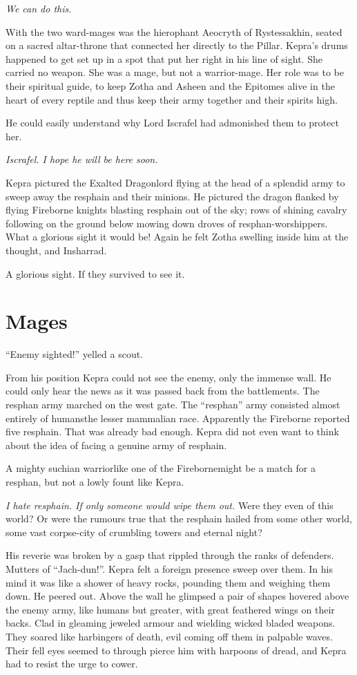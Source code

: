 \documentclass
  [a4paper,
   12pt,
   oneside
  ]%
  {article}
\begin{document}
\emph{We can do this.}

With the two ward-mages was the hierophant Aeocryth of Rystessakhin, seated on a sacred altar-throne that connected her directly to the Pillar. 
Kepra's drums happened to get set up in a spot that put her right in his line of sight. 
She carried no weapon. 
She was a mage, but not a warrior-mage. 
Her role was to be their spiritual guide, to keep Zotha and Asheen and the Epitomes alive in the heart of every reptile and thus keep their army together and their spirits high. 

He could easily understand why Lord Iscrafel had admonished them to protect her.

\emph{Iscrafel. I hope he will be here soon.} 

Kepra pictured the Exalted Dragonlord flying at the head of a splendid army to sweep away the resphain and their minions. He pictured the dragon flanked by flying Fireborne knights blasting resphain out of the sky; rows of shining cavalry following on the ground below mowing down droves of resphan-worshippers. 
What a glorious sight it would be! Again he felt Zotha swelling inside him at the thought, and Insharrad. 

A glorious sight. If they survived to see it.



\section{Mages}
``Enemy sighted!'' yelled a scout.

From his position Kepra could not see the enemy, only the immense wall. He could only hear the news as it was passed back from the battlements. 
The resphan army marched on the west gate. 
The ``resphan'' army consisted almost entirely of humans\dash{}the lesser mammalian race. 
Apparently the Fireborne reported five resphain. That was already bad enough. Kepra did not even want to think about the idea of facing a genuine army of resphain. 

A mighty suchian warrior\dash{}like one of the Fireborne\dash{}might be a match for a resphan, but not a lowly fount like Kepra. 

\emph{I hate resphain. If only someone would wipe them out.} Were they even of this world? Or were the rumours true that the resphain hailed from some other world, some vast corpse-city of crumbling towers and eternal night?

His reverie was broken by a gasp that rippled through the ranks of defenders. 
Mutters of ``Jach-dun!''. 
Kepra felt a foreign presence sweep over them.
In his mind it was like a shower of heavy rocks, pounding them and weighing them down. 
He peered out. Above the wall he glimpsed a pair of shapes hovered above the enemy army, like humans but greater, with great feathered wings on their backs. Clad in gleaming jeweled armour and wielding wicked bladed weapons. 
They soared like harbingers of death, evil coming off them in palpable waves. 
Their fell eyes seemed to through pierce him with harpoons of dread, and Kepra had to resist the urge to cower. 
\end{document}
